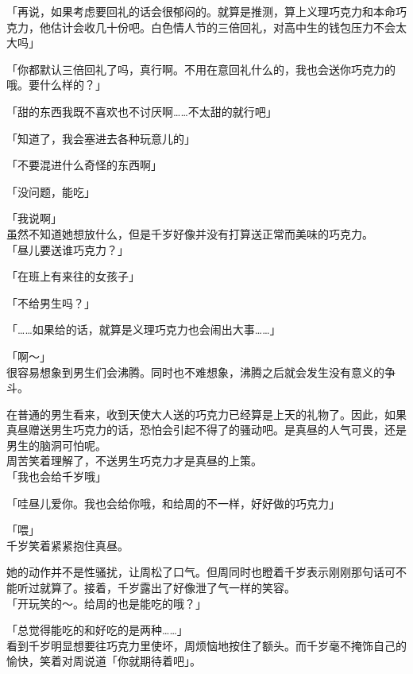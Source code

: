 「再说，如果考虑要回礼的话会很郁闷的。就算是推测，算上义理巧克力和本命巧克力，他估计会收几十份吧。白色情人节的三倍回礼，对高中生的钱包压力不会太大吗」

「你都默认三倍回礼了吗，真行啊。不用在意回礼什么的，我也会送你巧克力的哦。要什么样的？」

「甜的东西我既不喜欢也不讨厌啊……不太甜的就行吧」

「知道了，我会塞进去各种玩意儿的」

「不要混进什么奇怪的东西啊」

「没问题，能吃」

「我说啊」\\

虽然不知道她想放什么，但是千岁好像并没有打算送正常而美味的巧克力。\\

「昼儿要送谁巧克力？」

「在班上有来往的女孩子」

「不给男生吗？」

「……如果给的话，就算是义理巧克力也会闹出大事……」

「啊～」\\

很容易想象到男生们会沸腾。同时也不难想象，沸腾之后就会发生没有意义的争斗。

在普通的男生看来，收到天使大人送的巧克力已经算是上天的礼物了。因此，如果真昼赠送男生巧克力的话，恐怕会引起不得了的骚动吧。是真昼的人气可畏，还是男生的脑洞可怕呢。\\

周苦笑着理解了，不送男生巧克力才是真昼的上策。\\

「我也会给千岁哦」

「哇昼儿爱你。我也会给你哦，和给周的不一样，好好做的巧克力」

「喂」\\

千岁笑着紧紧抱住真昼。

她的动作并不是性骚扰，让周松了口气。但周同时也瞪着千岁表示刚刚那句话可不能听过就算了。接着，千岁露出了好像泄了气一样的笑容。\\

「开玩笑的～。给周的也是能吃的哦？」

「总觉得能吃的和好吃的是两种……」\\

看到千岁明显想要往巧克力里使坏，周烦恼地按住了额头。而千岁毫不掩饰自己的愉快，笑着对周说道「你就期待着吧」。
